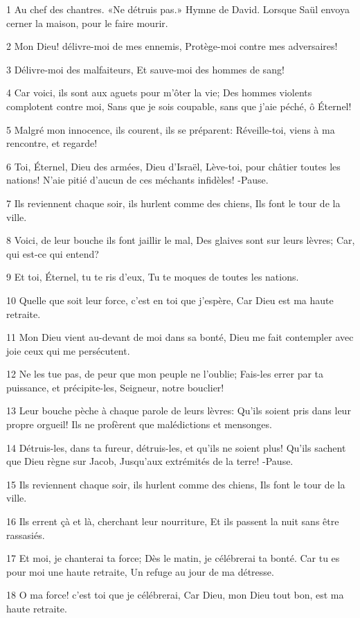 \par 1 Au chef des chantres. «Ne détruis pas.» Hymne de David. Lorsque Saül envoya cerner la maison, pour le faire mourir.
\par 2 Mon Dieu! délivre-moi de mes ennemis, Protège-moi contre mes adversaires!
\par 3 Délivre-moi des malfaiteurs, Et sauve-moi des hommes de sang!
\par 4 Car voici, ils sont aux aguets pour m'ôter la vie; Des hommes violents complotent contre moi, Sans que je sois coupable, sans que j'aie péché, ô Éternel!
\par 5 Malgré mon innocence, ils courent, ils se préparent: Réveille-toi, viens à ma rencontre, et regarde!
\par 6 Toi, Éternel, Dieu des armées, Dieu d'Israël, Lève-toi, pour châtier toutes les nations! N'aie pitié d'aucun de ces méchants infidèles! -Pause.
\par 7 Ils reviennent chaque soir, ils hurlent comme des chiens, Ils font le tour de la ville.
\par 8 Voici, de leur bouche ils font jaillir le mal, Des glaives sont sur leurs lèvres; Car, qui est-ce qui entend?
\par 9 Et toi, Éternel, tu te ris d'eux, Tu te moques de toutes les nations.
\par 10 Quelle que soit leur force, c'est en toi que j'espère, Car Dieu est ma haute retraite.
\par 11 Mon Dieu vient au-devant de moi dans sa bonté, Dieu me fait contempler avec joie ceux qui me persécutent.
\par 12 Ne les tue pas, de peur que mon peuple ne l'oublie; Fais-les errer par ta puissance, et précipite-les, Seigneur, notre bouclier!
\par 13 Leur bouche pèche à chaque parole de leurs lèvres: Qu'ils soient pris dans leur propre orgueil! Ils ne profèrent que malédictions et mensonges.
\par 14 Détruis-les, dans ta fureur, détruis-les, et qu'ils ne soient plus! Qu'ils sachent que Dieu règne sur Jacob, Jusqu'aux extrémités de la terre! -Pause.
\par 15 Ils reviennent chaque soir, ils hurlent comme des chiens, Ils font le tour de la ville.
\par 16 Ils errent çà et là, cherchant leur nourriture, Et ils passent la nuit sans être rassasiés.
\par 17 Et moi, je chanterai ta force; Dès le matin, je célébrerai ta bonté. Car tu es pour moi une haute retraite, Un refuge au jour de ma détresse.
\par 18 O ma force! c'est toi que je célébrerai, Car Dieu, mon Dieu tout bon, est ma haute retraite.


